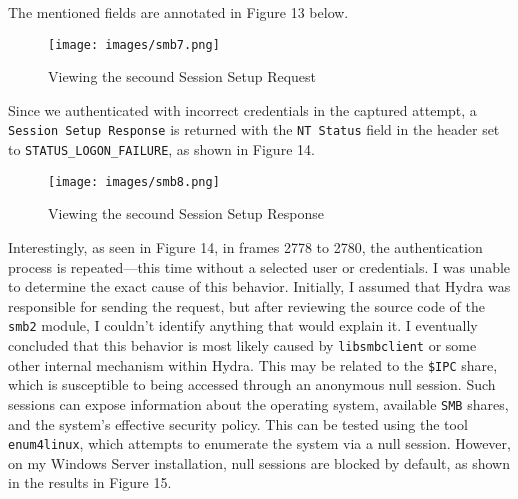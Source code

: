 \documentclass[a4paper]{article}
\newcommand{\abc}{\hfill \break}
\begin{document}
\abc \cite{noauthor_ms-smb2_2023, microsoft_corporation_server_2024}
The mentioned fields are annotated in Figure 13 below.
\begin{figure}[h]
	\texttt{[image: images/smb7.png]}
	\centering
	\caption{Viewing the secound Session Setup Request}
\end{figure}\abc \newpage \abc
Since we authenticated with incorrect credentials in the captured attempt, a \texttt{Session Setup Response} is returned with the \texttt{NT Status} field in the header set to \texttt{STATUS\_LOGON\_FAILURE}, as shown in Figure 14.
\begin{figure}[h]
	\texttt{[image: images/smb8.png]}
	\centering
	\caption{Viewing the secound Session Setup Response}
\end{figure}\abc
Interestingly, as seen in Figure 14, in frames 2778 to 2780, the authentication process is repeated—this time without a selected user or credentials. I was unable to determine the exact cause of this behavior. Initially, I assumed that Hydra was responsible for sending the request, but after reviewing the source code of the \texttt{smb2} module, I couldn’t identify anything that would explain it. I eventually concluded that this behavior is most likely caused by \texttt{libsmbclient} or some other internal mechanism within Hydra.\abc
This may be related to the \texttt{\$IPC} share, which is susceptible to being accessed through an anonymous null session. Such sessions can expose information about the operating system, available \texttt{SMB} shares, and the system's effective security policy. This can be tested using the tool \texttt{enum4linux}, which attempts to enumerate the system via a null session. However, on my Windows Server installation, null sessions are blocked by default, as shown in the results in Figure 15.\abc
\end{document}
